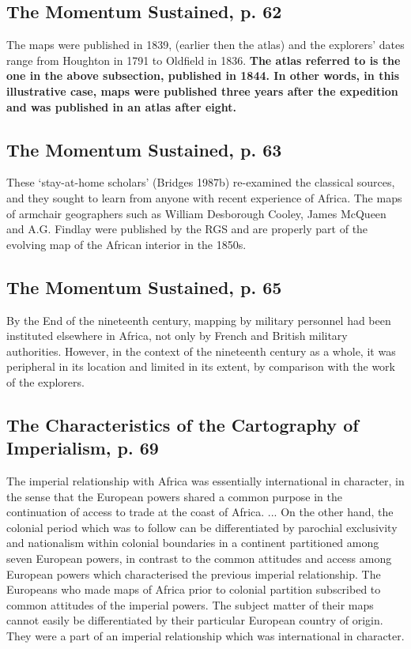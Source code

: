 \documentclass[12pt]{article}
\begin{document}
\subsection{The Momentum Sustained, p. 62}

The maps were published in 1839, (earlier then the atlas) and the explorers'
dates range from Houghton in 1791 to Oldfield in 1836. \textbf{The atlas
referred to is the one in the above subsection, published in 1844. In other
words, in this illustrative case, maps were published three years after the
expedition and was published in an atlas after eight.}

\subsection{The Momentum Sustained, p. 63}
These `stay-at-home scholars' (Bridges 1987b) re-examined the classical sources,
and they sought to learn from anyone with recent experience of Africa. The maps
of armchair geographers such as William Desborough Cooley, James McQueen and
A.G. Findlay were published by the RGS and are properly part of the evolving map
of the African interior in the 1850s.

\subsection{The Momentum Sustained, p. 65}
By the End of the nineteenth century, mapping by military personnel had been
instituted elsewhere in Africa, not only by French and British military
authorities. However, in the context of the nineteenth century as a whole, it
was peripheral in its location and limited in its extent, by comparison with the
work of the explorers. 

\subsection{The Characteristics of the Cartography of Imperialism, p. 69}

The imperial relationship with Africa was essentially international in
character, in the sense that the European powers shared a common purpose in the
continuation of access to trade at the coast of Africa. ... On the other hand,
the colonial period which was to follow can be differentiated by parochial
exclusivity and nationalism within colonial boundaries in a continent
partitioned among seven European powers, in contrast to the common attitudes and
access among European powers which characterised the previous imperial
relationship. The Europeans who made maps of Africa prior to colonial partition
subscribed to common attitudes of the imperial powers. The subject matter of
their maps cannot easily be differentiated by their particular European country
of origin. They were a part of an imperial relationship which was international
in character.
\end{document}
